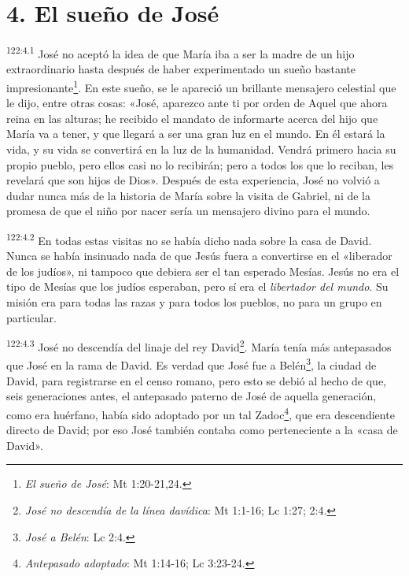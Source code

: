 \section*{4. El sueño de José}
\par 
\textsuperscript{122:4.1} José no aceptó la idea de que María iba a ser la madre de un hijo extraordinario hasta después de haber experimentado un sueño bastante impresionante\footnote{\textit{El sueño de José}: Mt 1:20-21,24.}. En este sueño, se le apareció un brillante mensajero celestial que le dijo, entre otras cosas: «José, aparezco ante ti por orden de Aquel que ahora reina en las alturas; he recibido el mandato de informarte acerca del hijo que María va a tener, y que llegará a ser una gran luz en el mundo. En él estará la vida, y su vida se convertirá en la luz de la humanidad. Vendrá primero hacia su propio pueblo, pero ellos casi no lo recibirán; pero a todos los que lo reciban, les revelará que son hijos de Dios». Después de esta experiencia, José no volvió a dudar nunca más de la historia de María sobre la visita de Gabriel, ni de la promesa de que el niño por nacer sería un mensajero divino para el mundo.

\par 
\textsuperscript{122:4.2} En todas estas visitas no se había dicho nada sobre la casa de David. Nunca se había insinuado nada de que Jesús fuera a convertirse en el «liberador de los judíos», ni tampoco que debiera ser el tan esperado Mesías. Jesús no era el tipo de Mesías que los judíos esperaban, pero sí era el \textit{libertador del mundo}. Su misión era para todas las razas y para todos los pueblos, no para un grupo en particular.

\par 
\textsuperscript{122:4.3} José no descendía del linaje del rey David\footnote{\textit{José no descendía de la línea davídica}: Mt 1:1-16; Lc 1:27; 2:4.}. María tenía más antepasados que José en la rama de David. Es verdad que José fue a Belén\footnote{\textit{José a Belén}: Lc 2:4.}, la ciudad de David, para registrarse en el censo romano, pero esto se debió al hecho de que, seis generaciones antes, el antepasado paterno de José de aquella generación, como era huérfano, había sido adoptado por un tal Zadoc\footnote{\textit{Antepasado adoptado}: Mt 1:14-16; Lc 3:23-24.}, que era descendiente directo de David; por eso José también contaba como perteneciente a la «casa de David».

